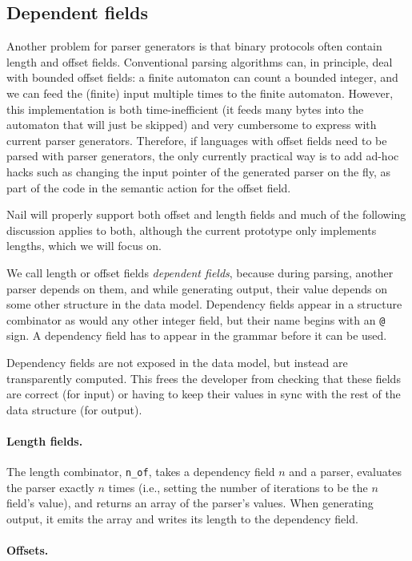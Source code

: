 \subsection{Dependent fields}
Another problem for parser generators is that binary protocols often contain
length and offset fields. Conventional parsing algorithms can, in principle,
deal with
bounded offset fields: a finite automaton can count a bounded integer, and we
can feed the (finite) input multiple times to the finite automaton. However,
this implementation is both time-inefficient (it feeds many bytes into the
automaton that will just be skipped) and very cumbersome to express with
current parser generators. Therefore, if languages with offset fields need
to be parsed
with parser generators, the only currently practical way is to add ad-hoc hacks
such as changing the input pointer of the generated parser on the fly, as part
of the code in the semantic action for the offset field.

Nail will properly support both offset and length fields and much of the
following discussion applies to both, although the current prototype only
implements lengths, which we will focus on.

We call length or offset fields \textit{dependent fields}, because during
parsing, another parser depends on them, and while generating output, their
value depends on some other structure in the data model. Dependency fields
appear in a structure combinator as would any other integer field, but
their name begins with an \texttt{@} sign.  A dependency field has to
appear in the grammar before it can be used.

Dependency fields are not exposed in the data model, but instead are
transparently computed.  This frees the developer from checking that
these fields are correct (for input) or having to keep their values in
sync with the rest of the data structure (for output).

\paragraph{Length fields.}

The length combinator, \texttt{n_of}, takes a dependency field $n$
and a parser, evaluates the parser exactly $n$ times (i.e., setting
the number of iterations to be the $n$ field's value), and returns
an array of the parser's values. When generating output, it emits
the array and writes its length to the dependency field.

\paragraph{Offsets.}

